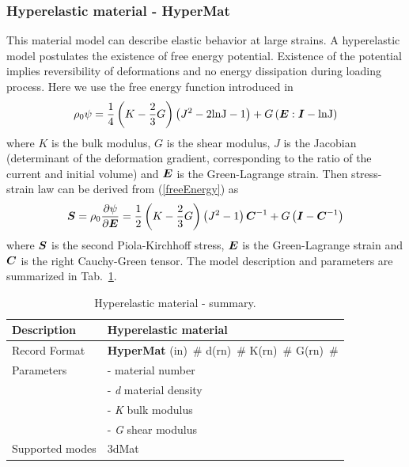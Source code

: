 \documentclass[a4paper]{article}
\newcommand{\mbf}[1]{\mbox{\boldmath$#1$}}
\newcommand{\descitem}[1]{{\noindent \bf #1}}
\newcommand{\elemparam}[2]{{{#1\tiny (#2)}~\#}}
\newcommand{\param}[1]{{\it #1}}
\begin{document}
\subsubsection{Hyperelastic material - HyperMat}
This material model can describe elastic behavior at large strains.
A hyperelastic model postulates the existence of free energy potential. Existence of the potential implies reversibility of deformations and no energy dissipation during loading process. Here we use the free energy function introduced in \cite{SimoHughes}
\begin{equation}\label{freeEnergy}
\rho_0 \psi = \frac{1}{4} \left(K - \frac{2}{3}G \right) \left( J^2 - 2 \rm{ln}J -1\right) + G \left(\mbf{E}:\mbf{I} - \rm{ln}J \right)
\end{equation}
where $K$ is the bulk modulus, $G$ is the shear modulus, $J$ is the Jacobian (determinant of the deformation gradient, corresponding to the ratio of the current and initial volume) and $\mbf{E}$ is the Green-Lagrange strain.
Then stress-strain law can be derived from (\ref{freeEnergy}) as
\begin{equation}
\mbf{S} = \rho_0 \frac{\partial \psi}{\partial \mbf{E}} = \frac{1}{2}\left(K - \frac{2}{3}G \right) \left(J^2 -1 \right)\mbf{C}^{-1} + G \left(\mbf{I} -\mbf{C}^{-1} \right)
\end{equation}
where $\mbf{S}$ is the second Piola-Kirchhoff stress, $\mbf{E}$ is the Green-Lagrange strain and $\mbf{C}$ is the right Cauchy-Green tensor.
The model description and parameters are summarized in Tab.~\ref{hyperElMat_table}.
\begin{table}[!htb]
\begin{tabular}{|l|p{9cm}|}
\hline
Description & Hyperelastic material\\
\hline
Record Format & \descitem{HyperMat}  \elemparam{}{in}
\elemparam{d}{rn} \elemparam{K}{rn} \elemparam{G}{rn} \\
Parameters &- \param{} material number\\
&- \param{d} material density\\
&- \param{K} bulk modulus\\
&- \param{G} shear modulus\\
Supported modes& 3dMat\\
\hline
\end{tabular}
\caption{Hyperelastic material - summary.}
\label{hyperElMat_table}
\end{table}
\end{document}
